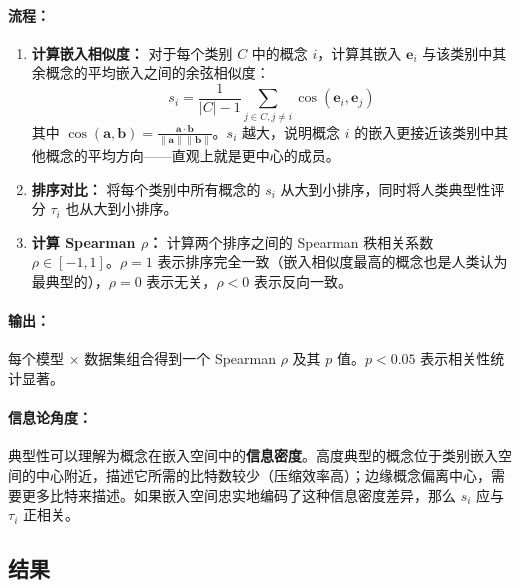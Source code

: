 \documentclass[11pt,a4paper]{article}
\begin{document}
\paragraph{流程：}
\begin{enumerate}[noitemsep]
  \item \textbf{计算嵌入相似度：} 对于每个类别 $C$ 中的概念 $i$，计算其嵌入 $\mathbf{e}_i$ 与该类别中其余概念的平均嵌入之间的余弦相似度：
  \[
  s_i = \frac{1}{|C|-1}\sum_{j \in C, j \neq i} \cos(\mathbf{e}_i, \mathbf{e}_j)
  \tag{14}
  \]
  其中 $\cos(\mathbf{a}, \mathbf{b}) = \frac{\mathbf{a} \cdot \mathbf{b}}{\|\mathbf{a}\|\|\mathbf{b}\|}$。$s_i$ 越大，说明概念 $i$ 的嵌入更接近该类别中其他概念的平均方向——直观上就是更中心的成员。
  \item \textbf{排序对比：} 将每个类别中所有概念的 $s_i$ 从大到小排序，同时将人类典型性评分 $\tau_i$ 也从大到小排序。
  \item \textbf{计算 Spearman $\rho$：} 计算两个排序之间的 Spearman 秩相关系数 $\rho \in [-1,1]$。$\rho=1$ 表示排序完全一致（嵌入相似度最高的概念也是人类认为最典型的），$\rho=0$ 表示无关，$\rho<0$ 表示反向一致。
\end{enumerate}

\paragraph{输出：} 每个模型 $\times$ 数据集组合得到一个 Spearman $\rho$ 及其 $p$ 值。$p<0.05$ 表示相关性统计显著。

\paragraph{信息论角度：} 典型性可以理解为概念在嵌入空间中的\textbf{信息密度}。高度典型的概念位于类别嵌入空间的中心附近，描述它所需的比特数较少（压缩效率高）；边缘概念偏离中心，需要更多比特来描述。如果嵌入空间忠实地编码了这种信息密度差异，那么 $s_i$ 应与 $\tau_i$ 正相关。

\subsection{结果}
\end{document}
